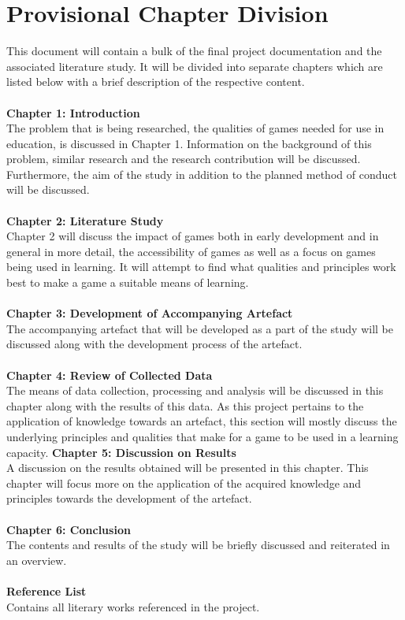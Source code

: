 \section{Provisional Chapter Division}
This document will contain a bulk of the final project documentation and the associated literature study. It will be divided into separate chapters which are listed below with a brief description of the respective content.
\\\\
\textbf{Chapter 1: Introduction} \\	
The problem that is being researched, the qualities of games needed for use in education, is discussed in Chapter 1. Information on the background of this problem, similar research and the research contribution will be discussed. Furthermore, the aim of the study in addition to the planned method of conduct will be discussed.
\\\\
\textbf{Chapter 2: Literature Study} \\
Chapter 2 will discuss the impact of games both in early development and in general in more detail, the accessibility of games as well as a focus on games being used in learning. It will attempt to find what qualities and principles work best to make a game a suitable means of learning.
\\\\
\textbf{Chapter 3: Development of Accompanying Artefact} \\
The accompanying artefact that will be developed as a part of the study will be discussed along with the development process of the artefact.
\\\\
\textbf{Chapter 4: Review of Collected Data} \\
The means of data collection, processing and analysis will be discussed in this chapter along with the results of this data. As this project pertains to the application of knowledge towards an artefact, this section will mostly discuss the underlying principles and qualities that make for a game to be used in a learning capacity.
\pagebreak
\textbf{Chapter 5: Discussion on Results} \\
A discussion on the results obtained will be presented in this chapter. This chapter will focus more on the application of the acquired knowledge and principles towards the development of the artefact.
\\\\
\textbf{Chapter 6: Conclusion} \\
The contents and results of the study will be briefly discussed and reiterated in an overview.
\\\\
\textbf{Reference List} \\
Contains all literary works referenced in the project.

